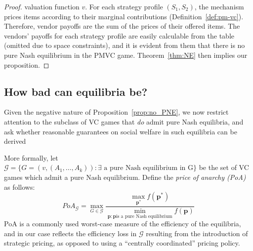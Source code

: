 \begin{proof}
valuation function $v$. For each strategy profile $(S_1,S_2)$,
the mechanism prices items according to their marginal
contributions (Definition~\ref{def:pm-vc}). Therefore,
vendor payoffs are the sum of the prices of their offered items. 
The vendors' payoffs for each strategy profile are easily calculable from the table (omitted due to space constraints), and it is evident from them that there is no pure Nash equilibrium in the PMVC
game. Theorem~\ref{thm:NE} then implies our proposition.
\end{proof}

\subsection{How bad can equilibria be?}

Given the negative nature of Proposition~\ref{prop:no_PNE},
we now 
restrict attention to the subclass of VC
games that \emph{do} admit pure Nash equilibria,
and ask whether reasonable
guarantees on social welfare in such equilibria can be derived

More formally, let $\mathcal{G}=\{G=(v,(A_1,\ldots,A_k)): \exists
\text{ a pure Nash equilibrium in G} \}$ be the set of VC
games which admit a pure Nash equilibrium. 
Define the \emph{price of anarchy (PoA)}
as follows:
\small
\[ PoA_{\mathcal{G}} = \max_{G \in
  \mathcal{G}}\frac{\max_{\mathbf{p^*}}f(\mathbf{p^*})}{\min_{\mathbf{p}:\mathbf{p}\text{
    is a pure Nash equilibrium}}f(\mathbf{p})}\]
    \normalsize
PoA is a commonly used worst-case measure of
the efficiency of the equilibria, and in our case reflects
the efficiency loss in
$\mathcal{G}$ resulting from the introduction of strategic
pricing, as opposed to using a ``centrally coordinated'' pricing policy.

